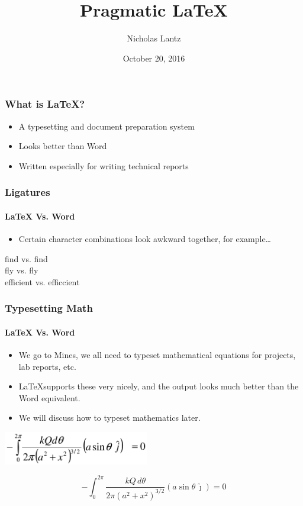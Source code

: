 \documentclass[xetex,mathserif,serif]{beamer}
\title{Pragmatic \LaTeX}
\author{Nicholas Lantz}
\date{October 20, 2016}
\begin{document}
\maketitle

\begin{frame}
    \frametitle{What is \LaTeX?}

    \begin{itemize}
        \item
            A typesetting and document preparation system
        \item
            Looks better than Word
        \item
            Written especially for writing technical reports
    \end{itemize}
\end{frame}

\begin{frame}
    \frametitle{Ligatures}
    \framesubtitle{\LaTeX{} Vs. Word}

    \begin{itemize}
        \item
            Certain character combinations look awkward together, for
            example\ldots
    \end{itemize}

    \Large
    find vs. {f}ind\\
    fly vs. {f}ly\\
    efficient vs. e{f}{f}{i}ccient
\end{frame}

\begin{frame}
    \frametitle{Typesetting Math}
    \framesubtitle{\LaTeX{} Vs. Word}

    \begin{itemize}
        \item
            We go to Mines, we all need to typeset mathematical equations for
            projects, lab reports, etc.
        \item
            \LaTeX supports these very nicely, and the output looks much better
            than the Word equivalent.
        \item
            We will discuss how to typeset mathematics later.
    \end{itemize}

    \centering
    \includegraphics[width=2.5in]{media/wordmath}

    \begin{displaymath}
        -\int_0^{2 \pi} \frac{kQ\, d\theta}{2\pi{\left(a^2 +
        x^2\right)}^{3/2}} (a \sin \theta \,\hat\jmath) = 0
    \end{displaymath}
\end{frame}
\end{document}

